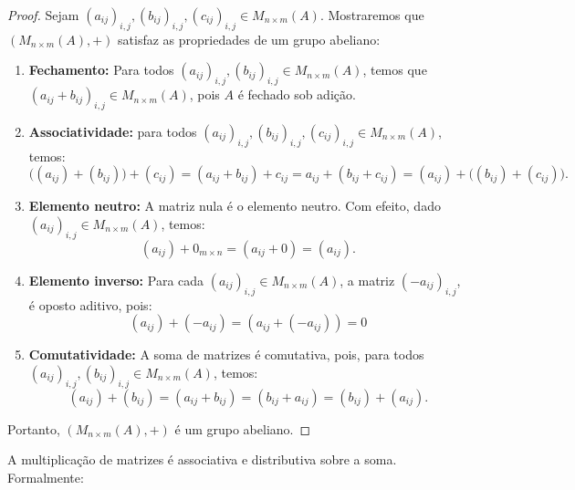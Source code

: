\begin{proof}
    Sejam $(a_{ij})_{i,j}, (b_{ij})_{i,j}, (c_{ij})_{i,j} \in M_{n \times m}(A)$. Mostraremos que $(M_{n \times m}(A), +)$ satisfaz as propriedades de um grupo abeliano:
    
    \begin{enumerate}
        \item \textbf{Fechamento:} Para todos $(a_{ij})_{i,j}, (b_{ij})_{i,j} \in M_{n \times m}(A)$, temos que $(a_{ij} + b_{ij})_{i,j} \in M_{n \times m}(A)$, pois $A$ é fechado sob adição.
    
        \item \textbf{Associatividade:} para todos $(a_{ij})_{i,j}, (b_{ij})_{i,j}, (c_{ij})_{i,j} \in M_{n \times m}(A)$, temos:
        \[
        \big((a_{ij}) + (b_{ij})\big) + (c_{ij}) = (a_{ij} + b_{ij}) + c_{ij} = a_{ij} + (b_{ij} + c_{ij}) = (a_{ij}) + \big((b_{ij}) + (c_{ij})\big).
        \]
    
        \item \textbf{Elemento neutro:} A matriz nula é o elemento neutro.
        Com efeito, dado $(a_{ij})_{i,j} \in M_{n \times m}(A)$, temos:
        \[
        (a_{ij}) + 0_{m\times n} = (a_{ij} + 0) = (a_{ij}).
        \]
    
        \item \textbf{Elemento inverso:} Para cada $(a_{ij})_{i,j} \in M_{n \times m}(A)$, a matriz $(-a_{ij})_{i,j}$, é oposto aditivo, pois:
        \[
        (a_{ij}) + (-a_{ij}) = (a_{ij} +(-a_{ij})) = 0
        \]
    
        \item \textbf{Comutatividade:} A soma de matrizes é comutativa, pois, para todos $(a_{ij})_{i,j}, (b_{ij})_{i,j} \in M_{n \times m}(A)$, temos:
        \[
        (a_{ij}) + (b_{ij}) = (a_{ij} + b_{ij}) = (b_{ij} + a_{ij}) = (b_{ij}) + (a_{ij}).
        \]
    \end{enumerate}
    
    Portanto, $(M_{n \times m}(A), +)$ é um grupo abeliano.
\end{proof}

A multiplicação de matrizes é associativa e distributiva sobre a soma. Formalmente:

